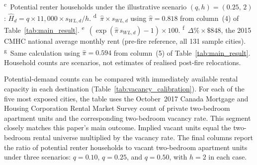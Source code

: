 \documentclass[12pt]{article}
\begin{document}
\begin{table}[htbp]
{\begin{threeparttable}
\begin{tablenotes}[flushleft]
        \textsuperscript{c}~Potential renter households under the illustrative
        scenario $(q,h)=(0.25,\,2)$:
        $\widehat{H}_{d}=q\times 11{,}000\times s_{WL,d}/h$.
        \textsuperscript{d}~$\hat{\pi}\times s_{WL,d}$ using
        $\hat{\pi}=0.818$ from column~(4) of Table~\ref{tab:main_result}.
        \textsuperscript{e}~$(\exp(\hat{\pi}\,s_{WL,d})-1)\times 100$.
        \textsuperscript{f}~$\Delta\%\times\$848$, the 2015 CMHC national average
        monthly rent (pre-fire reference, all 131 sample cities).
        \textsuperscript{g}~Same calculation using $\hat{\pi}=0.594$
        from column~(5) of Table~\ref{tab:main_result}.
        Household counts are scenarios, not estimates of realised
        post-fire relocations.
    \end{tablenotes}
  \end{threeparttable}}
\end{table}

Potential-demand counts can be compared with immediately available rental capacity
in each destination (Table~\ref{tab:vacancy_calibration}). For each
of the five most exposed cities, the table uses the October~2017 Canada Mortgage and Housing Corporation Rental
Market Survey count of private two-bedroom apartment units and the corresponding
two-bedroom vacancy rate. This segment closely matches this paper's main outcome.
Implied vacant units equal the two-bedroom rental universe multiplied by the
vacancy rate. The final columns report the ratio of potential renter households
to vacant two-bedroom apartment units under three scenarios:
$q=0.10$, $q=0.25$, and $q=0.50$, with $h=2$ in each case.
\end{document}
